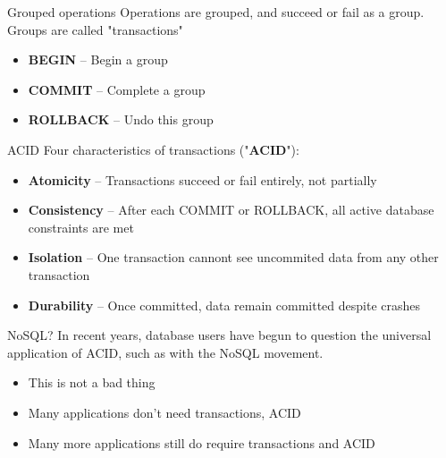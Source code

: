 \documentclass[svgnames]{beamer}
\begin{document}
\begin{frame}{Grouped operations}
    Operations are grouped, and succeed or fail as a group. Groups are called "transactions"

    \begin{itemize}
        \item \textbf{BEGIN} -- Begin a group
        \item \textbf{COMMIT} -- Complete a group
        \item \textbf{ROLLBACK} -- Undo this group
    \end{itemize}
\end{frame}

\begin{frame}{ACID}
    Four characteristics of transactions ("\textbf{ACID}"):
    \begin{itemize}
        \item \textbf{Atomicity} -- Transactions succeed or fail entirely, not partially
        \item \textbf{Consistency} -- After each COMMIT or ROLLBACK, all active database constraints are met
        \item \textbf{Isolation} -- One transaction cannont see uncommited data from any other transaction
        \item \textbf{Durability} -- Once committed, data remain committed despite crashes
    \end{itemize}
\end{frame}


\begin{frame}{NoSQL?}
    In recent years, database users have begun to question the universal
    application of ACID, such as with the NoSQL movement.
    \begin{itemize}
        \item This is not a bad thing
        \item Many applications don't need transactions, ACID
        \item Many more applications still do require transactions and ACID
    \end{itemize}
\end{frame}
\end{document}
